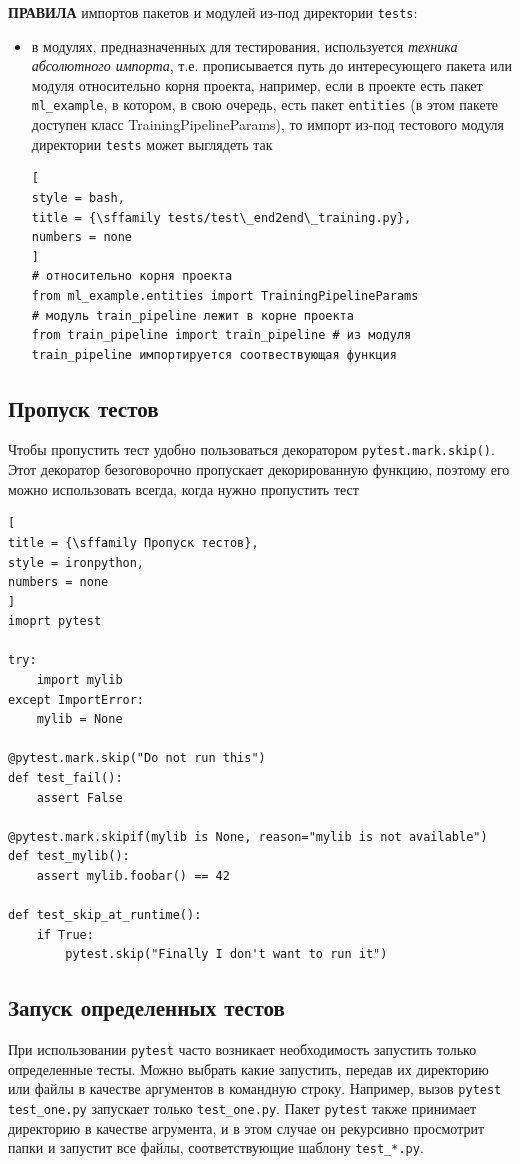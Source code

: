 \documentclass[%
	11pt,
	a4paper,
	utf8,
		]{article}
\begin{document}
\textbf{ПРАВИЛА} импортов пакетов и модулей из-под директории \texttt{tests}:
\begin{itemize}
	\item в модулях, предназначенных для тестирования, используется \emph{техника абсолютного импорта}, т.е. прописывается путь до интересующего пакета или модуля относительно корня проекта, например, если в проекте есть пакет \texttt{ml\_example}, в котором, в свою очередь, есть пакет \texttt{entities} (в этом пакете доступен класс TrainingPipelineParams), то импорт из-под тестового модуля директории \texttt{tests} может выглядеть так
\begin{lstlisting}[
style = bash,
title = {\sffamily tests/test\_end2end\_training.py},
numbers = none	
]
# относительно корня проекта
from ml_example.entities import TrainingPipelineParams
# модуль train_pipeline лежит в корне проекта
from train_pipeline import train_pipeline # из модуля train_pipeline импортируется соотвествующая функция
\end{lstlisting}
\end{itemize}


\subsection{Пропуск тестов}

Чтобы пропустить тест удобно пользоваться декоратором \texttt{pytest.mark.skip()}. Этот декоратор безоговорочно пропускает декорированную функцию, поэтому его можно использовать всегда, когда нужно пропустить тест
\begin{lstlisting}[
title = {\sffamily Пропуск тестов},
style = ironpython,
numbers = none	
]
imoprt pytest

try:
    import mylib
except ImportError:
    mylib = None
    
@pytest.mark.skip("Do not run this")
def test_fail():
    assert False
    
@pytest.mark.skipif(mylib is None, reason="mylib is not available")
def test_mylib():
    assert mylib.foobar() == 42
    
def test_skip_at_runtime():
    if True:
        pytest.skip("Finally I don't want to run it")
\end{lstlisting}

\subsection{Запуск определенных тестов}

При использовании \texttt{pytest} часто возникает необходимость запустить только определенные тесты. Можно выбрать какие запустить, передав их директорию или файлы в качестве аргументов в командную строку. Например, вызов \texttt{pytest test\_one.py} запускает только \texttt{test\_one.py}. Пакет \texttt{pytest} также принимает директорию в качестве агрумента, и в этом случае он рекурсивно просмотрит папки и запустит все файлы, соответствующие шаблону \texttt{test\_*.py}.
\end{document}
